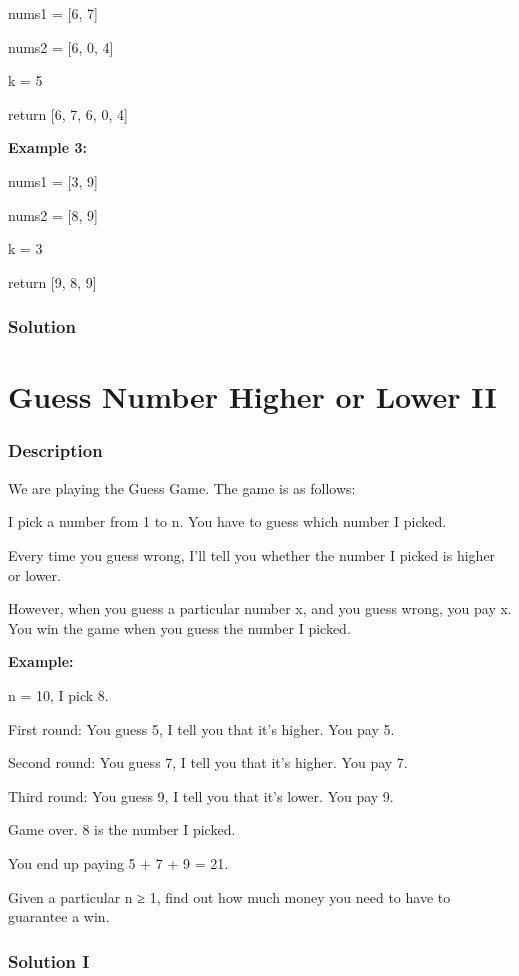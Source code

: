 nums1 = [6, 7]

nums2 = [6, 0, 4]

k = 5

return [6, 7, 6, 0, 4]

\textbf{Example 3:}

nums1 = [3, 9]

nums2 = [8, 9]

k = 3

return [9, 8, 9]
\subsubsection{Solution}

\begin{Code}

\end{Code}

\newpage

\section{Guess Number Higher or Lower II} %

\subsubsection{Description}
We are playing the Guess Game. The game is as follows:

I pick a number from 1 to n. You have to guess which number I picked.

Every time you guess wrong, I'll tell you whether the number I picked is higher or lower.

However, when you guess a particular number x, and you guess wrong, you pay x. You win the game when you guess the number I picked.

\textbf{Example:}

n = 10, I pick 8.

First round:  You guess 5, I tell you that it's higher. You pay 5.

Second round: You guess 7, I tell you that it's higher. You pay 7.

Third round:  You guess 9, I tell you that it's lower. You pay 9.

Game over. 8 is the number I picked.

You end up paying 5 + 7 + 9 = 21.

Given a particular n ≥ 1, find out how much money you need to have to guarantee a win.
\subsubsection{Solution I}

